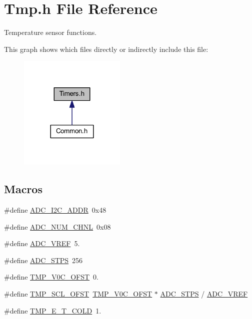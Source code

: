 \hypertarget{a00041}{\section{Tmp.\-h File Reference}
\label{a00041}
}


Temperature sensor functions.  


This graph shows which files directly or indirectly include this file\-:
\nopagebreak
\begin{figure}[H]
\begin{center}
\leavevmode
\includegraphics[width=144pt]{a00059}
\end{center}
\end{figure}
\subsection*{Macros}
\begin{DoxyCompactItemize}
\item 
\#define \hyperlink{a00041_a5fd3aabe18504a5314a5d0e71e3bc495}{A\-D\-C\-\_\-\-I2\-C\-\_\-\-A\-D\-D\-R}~0x48
\item 
\#define \hyperlink{a00041_a448e8a52be570dfe9fdddb2045039534}{A\-D\-C\-\_\-\-N\-U\-M\-\_\-\-C\-H\-N\-L}~0x08
\item 
\#define \hyperlink{a00041_a5a03d0b939a8dda552c9fe3319a82485}{A\-D\-C\-\_\-\-V\-R\-E\-F}~5.
\item 
\#define \hyperlink{a00041_a9be6401f8c9339711816bec5ca55dd88}{A\-D\-C\-\_\-\-S\-T\-P\-S}~256
\item 
\#define \hyperlink{a00041_a6d41a70e126c748f2c99c3ff8228eb1b}{T\-M\-P\-\_\-\-V0\-C\-\_\-\-O\-F\-S\-T}~0.
\item 
\#define \hyperlink{a00041_a0f910bb108922c8686a139977510af53}{T\-M\-P\-\_\-\-S\-C\-L\-\_\-\-O\-F\-S\-T}~\hyperlink{a00041_a6d41a70e126c748f2c99c3ff8228eb1b}{T\-M\-P\-\_\-\-V0\-C\-\_\-\-O\-F\-S\-T} $\ast$ \hyperlink{a00041_a9be6401f8c9339711816bec5ca55dd88}{A\-D\-C\-\_\-\-S\-T\-P\-S} / \hyperlink{a00041_a5a03d0b939a8dda552c9fe3319a82485}{A\-D\-C\-\_\-\-V\-R\-E\-F}
\item 
\#define \hyperlink{a00041_acc66f9f90ea4746679f5d26c834ddea5}{T\-M\-P\-\_\-\-E\-\_\-\-T\-\_\-\-C\-O\-L\-D}~1.
\end{DoxyCompactItemize}
